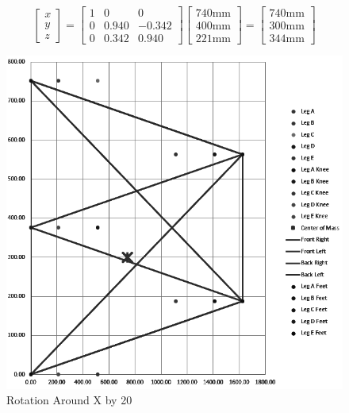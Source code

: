 \begin{equation} \label{eq:rotational_matrix}
    \left[ \begin{array}{ccc} x \\ y \\ z \end{array} \right] = 
    \left[ \begin{array}{ccc} 1 & 0 & 0 \\ 0 & 0.940 & -0.342 \\ 0 & 0.342 & 0.940
    \end{array} \right]
    \left[ \begin{array}{ccc} 740 \text{mm} \\ 400 \text{mm} \\ 221 \text{mm} \end{array} \right] = \left[ \begin{array}{ccc} 740 \text{mm} \\ 300 \text {mm} \\ 344 \text {mm} \end{array} \right]
\end{equation}



\begin{figure} [H]
    \centering
    \includegraphics[width=\textwidth]{5_KinematicAndForces/img/CenterMass_20_X.PNG}
    \caption{Rotation Around X by 20\textdegree{}}
    \label{fig:rotation_20}
\end{figure}


